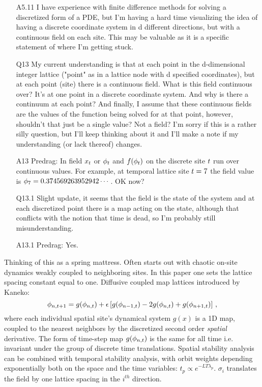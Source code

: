 \begin{description}
\begin{itemize}
	\item[A5.11]
I have experience with finite difference methods for solving a
discretized form of a PDE, but I'm having a hard time visualizing the
idea of having a discrete coordinate system in d different directions,
but with a continuous field on each site. This  may be valuable as it is
a specific statement of where I'm getting stuck.
	\item[Q13]
My current understanding is
that at each point in the d-dimensional integer lattice ("point" as in a
lattice node with d specified coordinates), but at each point (site)
there is a continuous field. What is this field continuous over? It's at
one point in a discrete coordinate system. And why is there a continuum
at each point? And finally, I assume that these continuous fields are the
values of the function being solved for at that point, however, shouldn't
that just be a single value? Not a field? I'm sorry if this is a rather
silly question, but I'll keep thinking about it and I'll make a note if
my understanding (or lack thereof) changes.
	\item[A13]
Predrag: In  field $x_{t}$ or $\phi_{t}$ and
$f(\phi_{t})$  on the discrete site $t$ run over continuous values.
For example, at temporal lattice site $t=7$ the field value is
$\phi_7=0.374569263952942\cdots$. OK now?
	\item[Q13.1]
Slight update, it seems that the field is the state of the system and at each discretized point there is a map acting on the state, although that conflicts with the notion that time is dead, so I'm probably still misunderstanding.
	\item[A13.1]
Predrag: Yes.
\end{itemize}
Thinking of this as a spring mattress. Often starts out with chaotic on-site dynamics weakly coupled to neighboring sites.
In this paper one sets the lattice spacing constant equal to one. Diffusive coupled map lattices introduced by Kaneko:
\[
\phi_{n,t+1}=
g(\phi_{n,t})+\epsilon\left[g(\phi_{n-1,t})-2g(\phi_{n,t})+g(\phi_{n+1,t})\right]
\,,
\]
where each individual spatial site's dynamical system $g(x)$ is a 1D map, coupled to the nearest neighbors by the discretized second order \emph{spatial} derivative. The form of time-step map $g(\phi_{n,t})$ is the same for all time i.e. invariant under the group of discrete time translations. Spatial stability analysis can be combined with temporal stability analysis, with orbit weights depending exponentially both on the space and the time variables: $t_p\propto e^{-LT\lambda_p}$. $\sigma_i$ translates the field by one lattice spacing in the $i^{th}$ direction.

\end{description}
